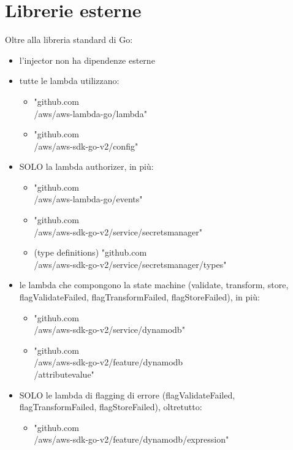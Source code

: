 \documentclass[
    sigconf, 
    screen=false, 
    acmthm=false, 
    nonacm
]{acmart}
\begin{document}
\section{Librerie esterne}
Oltre alla libreria standard di Go:
\begin{itemize}
    \item l'injector non ha dipendenze esterne
    \item tutte le lambda utilizzano: 
    \begin{itemize}
        \item "github.com\\/aws/aws-lambda-go/lambda" \cite{awslambdago}
        \item "github.com\\/aws/aws-sdk-go-v2/config" \cite{awssdkgo}
    \end{itemize}
    \item SOLO la lambda authorizer, in più:
    \begin{itemize}
        \item "github.com\\/aws/aws-lambda-go/events" \cite{awslambdago}
        \item "github.com\\/aws/aws-sdk-go-v2/service/secretsmanager" \cite{awssdkgo}
        \item (type definitions) "github.com\\/aws/aws-sdk-go-v2/service/secretsmanager/types" \\ \cite{awssdkgo}
    \end{itemize}
    \item le lambda che compongono la state machine (validate, transform, store, flagValidateFailed, flagTransformFailed, flagStoreFailed), in più:
    \begin{itemize}
        \item "github.com\\/aws/aws-sdk-go-v2/service/dynamodb" \cite{awssdkgo}
        \item "github.com\\/aws/aws-sdk-go-v2/feature/dynamodb\\/attributevalue" \cite{awssdkgo}
    \end{itemize}
    \item SOLO le lambda di flagging di errore (flagValidateFailed, flagTransformFailed, flagStoreFailed), oltretutto:
    \begin{itemize}
        \item "github.com\\/aws/aws-sdk-go-v2/feature/dynamodb/expression" \\ \cite{awssdkgo}

\end{itemize}
\end{itemize}
\end{document}
